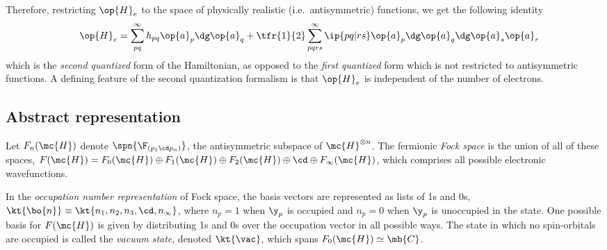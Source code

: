 \documentclass[11pt,fleqn]{article}
\numberwithin{equation}{section}
\begin{document}
\begin{rmk}
Therefore, restricting $\op{H}_e$ to the space of physically realistic (i.e.~antisymmetric) functions, we get the following identity
\begin{align}\label{second-quantized-hamiltonian}
&&
  \op{H}_e
=
  \sum_{pq}^\infty
  h_{pq}
  \op{a}_p\dg \op{a}_q
+
  \tfr{1}{2}
  \sum_{pqrs}^\infty
  \ip{pq|rs}
  \op{a}_p\dg\op{a}_q\dg\op{a}_s\op{a}_r
\end{align}
which is the \textit{second quantized} form of the Hamiltonian, as opposed to the \textit{first quantized} form which is not restricted to antisymmetric functions.
A defining feature of the second quantization formalism is that $\op{H}_e$ is independent of the number of electrons.
\end{rmk}


\subsection{Abstract representation}

\begin{dfn}\label{fock-space}
Let $F_n(\mc{H})$ denote $\spn\{\F_{(p_1\cd p_n)}\}$, the antisymmetric subspace of $\mc{H}^{\otimes n}$.
The fermionic \textit{Fock space} is the union of all of these spaces, $F(\mc{H})=F_0(\mc{H})\oplus F_1(\mc{H})\oplus F_2(\mc{H})\oplus\cd\oplus F_{\infty}(\mc{H})$, which comprises all possible electronic wavefunctions.
\end{dfn}

\begin{dfn}\label{occupation-number-representation}
In the \textit{occupation number representation} of Fock space, the basis vectors are represented as lists of 1s and 0s,
$
  \kt{\bo{n}}
\equiv
  \kt{n_1,n_2,n_3,\cd,n_\infty}
$,
where $n_p=1$ when $\y_p$ is occupied and $n_p=0$ when $\y_p$ is unoccupied in the state.
One possible basis for $F(\mc{H})$ is given by distributing 1s and 0s over the occupation vector in all possible ways.
The state in which no spin-orbitals are occupied is called the \textit{vacuum state}, denoted $\kt{\vac}$, which spans $F_0(\mc{H})\simeq\mb{C}$.
\end{dfn}
\end{document}
